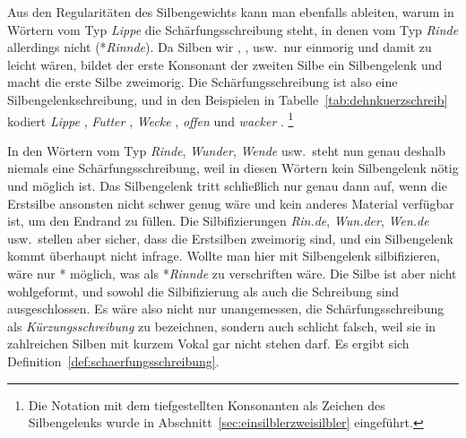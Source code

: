 Aus den Regularitäten des Silbengewichts kann man ebenfalls ableiten, warum in Wörtern vom Typ \textit{Lippe} die Schärfungsschreibung steht, in denen vom Typ \textit{Rinde} allerdings nicht (*\textit{Rinnde}).
Da Silben wir \textipa{[lI]}, \textipa{[fU]}, \textipa{[vE]} usw.\ nur einmorig und damit zu leicht wären, bildet der erste Konsonant der zweiten Silbe ein Silbengelenk und macht die erste Silbe zweimorig.
Die Schärfungsschreibung ist also eine Silbengelenkschreibung, und in den Beispielen in Tabelle~\ref{tab:dehnkuerzschreib} kodiert \textit{Lippe} \textipa{[lI\Sgel{p}@]}, \textit{Futter} \textipa{[fU\Sgel{t}5]}, \textit{Wecke} \textipa{[vE\Sgel{k}@]}, \textit{offen} \textipa{[O\Sgel{f}@n]} und \textit{wacker} \textipa{[va\Sgel{k}5]}.%
\footnote{Die Notation mit dem tiefgestellten Konsonanten als Zeichen des Silbengelenks wurde in Abschnitt~\ref{sec:einsilblerzweisilbler} eingeführt.}

In den Wörtern vom Typ \textit{Rinde}, \textit{Wunder}, \textit{Wende} usw.\ steht nun genau deshalb niemals eine Schärfungsschreibung, weil in diesen Wörtern kein Silbengelenk nötig und möglich ist.
Das Silbengelenk tritt schließlich nur genau dann auf, wenn die Erstsilbe ansonsten nicht schwer genug wäre und kein anderes Material verfügbar ist, um den Endrand zu füllen.
Die Silbifizierungen \textit{Rin.de}, \textit{Wun.der}, \textit{Wen.de} usw.\ stellen aber sicher, dass die Erstsilben zweimorig sind, und ein Silbengelenk kommt überhaupt nicht infrage.
Wollte man hier mit Silbengelenk silbifizieren, wäre nur *\textipa{[KI\Sgel{n}d@]} möglich, was als *\textit{Rinnde} zu verschriften wäre.
Die Silbe \textipa{[nd@]} ist aber nicht wohlgeformt, und sowohl die Silbifizierung als auch die Schreibung sind ausgeschlossen.
Es wäre also nicht nur unangemessen, die Schärfungsschreibung als \textit{Kürzungsschreibung} zu bezeichnen, sondern auch schlicht falsch, weil sie in zahlreichen Silben mit kurzem Vokal gar nicht stehen darf.
Es ergibt sich Definition~\ref{def:schaerfungsschreibung}.


